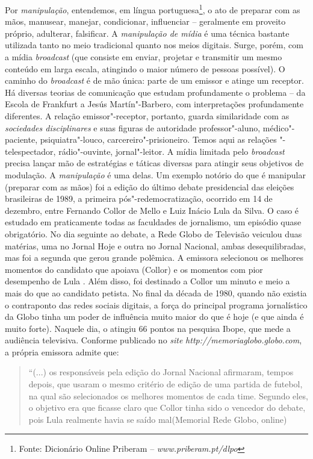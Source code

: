 Por \emph{manipulação}, entendemos, em língua portuguesa\footnote{Fonte:
  Dicionário Online Priberam -- \emph{www.priberam.pt/dlpo}}, o
ato de preparar com as mãos, manusear, manejar, condicionar, influenciar
-- geralmente em proveito próprio, adulterar, falsificar. A
\emph{manipulação de mídia} é uma técnica bastante utilizada tanto no
meio tradicional quanto nos meios digitais. Surge, porém, com a mídia
\emph{broadcast} (que consiste em enviar, projetar e transmitir um mesmo
conteúdo em larga escala, atingindo o maior número de pessoas possível).
O caminho do \emph{broadcast} é de mão única: parte de um emissor e
atinge um receptor. Há diversas teorias de comunicação que estudam
profundamente o problema -- da Escola de Frankfurt a Jesús
Martín"-Barbero, com interpretações profundamente diferentes. A relação
emissor"-receptor, portanto, guarda similaridade com as \emph{sociedades
disciplinares} e suas figuras de autoridade professor"-aluno,
médico"-paciente, psiquiatra"-louco, carcereiro"-prisioneiro. Temos aqui as
relações "-telespectador, rádio"-ouvinte, jornal"-leitor. A mídia
limitada pelo \emph{broadcast} precisa lançar mão de estratégias e
táticas diversas para atingir seus objetivos de modulação. A
\emph{manipulação} é uma delas. Um exemplo notório do que é manipular
(preparar com as mãos) foi a edição do último debate presidencial das
eleições brasileiras de 1989, a primeira pós"-redemocratização, ocorrido
em 14 de dezembro, entre Fernando Collor de Mello e Luiz Inácio Lula da
Silva. O caso é estudado em praticamente todas as faculdades de
jornalismo, um episódio quase obrigatório. No dia seguinte ao debate, a
Rede Globo de Televisão veiculou duas matérias, uma no Jornal Hoje e
outra no Jornal Nacional, ambas desequilibradas, mas foi a segunda que
gerou grande polêmica. A emissora selecionou os melhores momentos do
candidato que apoiava (Collor) e os momentos com pior desempenho de Lula
. Além disso, foi destinado a Collor um minuto e meio a mais do que ao
candidato petista. No final da década de 1980, quando não existia o
contraponto das redes sociais digitais, a força do principal programa
jornalístico da Globo tinha um poder de influência muito maior do que é
hoje (e que ainda é muito forte). Naquele dia, o  atingiu 66 pontos na
pesquisa Ibope, que mede a audiência televisiva. Conforme publicado no
\emph{site} \emph{http://memoriaglobo.globo.com}, a própria emissora admite que:

\begin{quote}
``(...) os responsáveis pela edição do Jornal Nacional afirmaram, tempos
depois, que usaram o mesmo critério de edição de uma partida de futebol,
na qual são selecionados os melhores momentos de cada time. Segundo
eles, o objetivo era que ficasse claro que Collor tinha sido o vencedor
do debate, pois Lula realmente havia se saído mal(Memorial Rede Globo,
online)
\end{quote}


